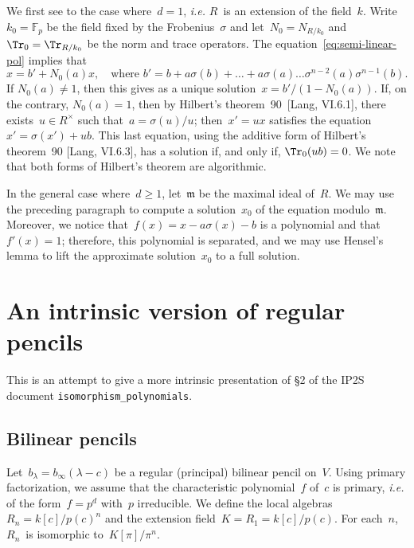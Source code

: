 \documentclass{article}
\def\F{\mathbb{F}}
\let\fr\mathfrak
\begin{document}
We first see to the case where~$d = 1$, \emph{i.e.} $R$~is an extension
of the field~$k$. Write~$k_0 = \F_p$ be the field fixed by the
Frobenius~$σ$ and let~$N_0 = N_{R/k_0}$ and~$\Tr_0 = \Tr_{R/k_0}$ be the
norm and trace operators. The equation~\eqref{eq:semi-linear-pol} implies
that
\begin{equation}
x = b' + N_0(a) x, \quad\text{where $b' = b + a σ(b) + … + a σ(a) …
σ^{n-2}(a) σ^{n-1}(b)$.}
\end{equation}
If $N_0(a) ≠ 1$, then this gives as a unique solution~$x =
b'/(1-N_0(a))$. If, on the contrary, $N_0(a) = 1$, then by
Hilbert's theorem~90~[Lang, VI.6.1], there exists~$u ∈ R^{×}$ such
that~$a = σ(u)/u$; then~$x' = ux$ satisfies the equation~$x' = σ(x') +
ub$. This last equation, using the additive form of Hilbert's theorem~90
[Lang, VI.6.3], has a solution if, and only if, $\Tr_0 (ub) = 0$. We
note that both forms of Hilbert's theorem are algorithmic.

In the general case where~$d ≥ 1$, let~$\fr m$ be the maximal ideal
of~$R$. We may use the preceding paragraph to compute a solution~$x_0$ of
the equation modulo~$\fr m$. Moreover, we notice that~$f(x) = x -  a σ(x)
- b$ is a polynomial and that~$f'(x) = 1$; therefore, this polynomial is
separated, and we may use Hensel's lemma to lift the approximate
solution~$x_0$ to a full solution.

\section{An intrinsic version of regular pencils}

This is an attempt to give a more intrinsic presentation of §2
of the IP2S document
\texttt{isomorphism\_polynomials}.

\subsection{Bilinear pencils}

Let~$b_{λ} = b_{∞} (λ - c)$ be a regular (principal) bilinear pencil
on~$V$. Using primary factorization, we assume that the characteristic
polynomial~$f$ of~$c$ is primary, \emph{i.e.} of the form~$f = p^d$
with~$p$ irreducible. We define the local algebras~$R_n = k[c]/p(c)^n$
and the extension field~$K = R_1 = k[c]/p(c)$. For each~$n$, $R_n$~is
isomorphic to~$K[π]/π^n$.

\end{document}
